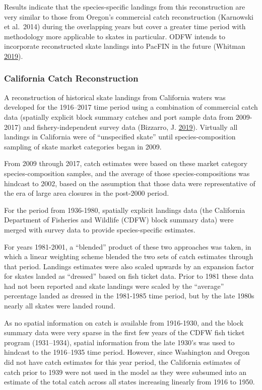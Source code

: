 \documentclass[12pt,]{article}
\begin{document}
Results indicate that the species-specific landings from this
reconstruction are very similar to those from Oregon's commercial catch
reconstruction (Karnowski et al.~2014) during the overlapping years but
cover a greater time period with methodology more applicable to skates
in particular. ODFW intends to incorporate reconstructed skate landings
into PacFIN in the future (Whitman
\protect\hyperlink{ref-Whitman2019}{2019}).

\hypertarget{california-catch-reconstruction}{%
\subsubsection{California Catch
Reconstruction}\label{california-catch-reconstruction}}

A reconstruction of historical skate landings from California waters was
developed for the 1916--2017 time period using a combination of
commercial catch data (spatially explicit block summary catches and port
sample data from 2009-2017) and fishery-independent survey data
(Bizzarro, J. \protect\hyperlink{ref-Bizzarro2019}{2019}). Virtually all
landings in California were of ``unspecified skate'' until
species-composition sampling of skate market categories began in 2009.

From 2009 through 2017, catch estimates were based on these market
category species-composition samples, and the average of those
species-compositions was hindcast to 2002, based on the assumption that
those data were representative of the era of large area closures in the
post-2000 period.

For the period from 1936-1980, spatially explicit landings data (the
California Department of Fisheries and Wildlife (CDFW) block summary
data) were merged with survey data to provide species-specific
estimates.

For years 1981-2001, a ``blended'' product of these two approaches was
taken, in which a linear weighting scheme blended the two sets of catch
estimates through that period. Landings estimates were also scaled
upwards by an expansion factor for skates landed as ``dressed'' based on
fish ticket data. Prior to 1981 these data had not been reported and
skate landings were scaled by the ``average'' percentage landed as
dressed in the 1981-1985 time period, but by the late 1980s nearly all
skates were landed round.

As no spatial information on catch is available from 1916-1930, and the
block summary data were very sparse in the first few years of the CDFW
fish ticket program (1931--1934), spatial information from the late
1930's was used to hindcast to the 1916--1935 time period. However,
since Washington and Oregon did not have catch estimates for this year
period, the California estimates of catch prior to 1939 were not used in
the model as they were subsumed into an estimate of the total catch
across all states increasing linearly from 1916 to 1950.
\end{document}
